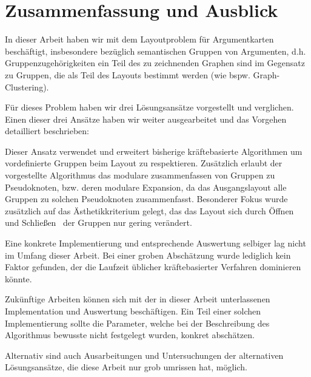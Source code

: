 \chapter{Zusammenfassung und Ausblick}
In dieser Arbeit haben wir mit dem Layoutproblem für Argumentkarten beschäftigt, insbesondere bezüglich semantischen %
Gruppen von Argumenten, 
d.h. Gruppenzugehörigkeiten ein Teil des zu zeichnenden Graphen sind im Gegensatz zu Gruppen, die als Teil des Layouts bestimmt werden (wie bspw. Graph-Clustering).

Für dieses Problem haben wir drei Lösungsansätze vorgestellt und verglichen. 
Einen dieser drei Ansätze %
 haben wir weiter ausgearbeitet und das Vorgehen detailliert beschrieben:

Dieser Ansatz %
verwendet und erweitert bisherige kräftebasierte Algorithmen um vordefinierte Gruppen beim Layout zu respektieren. 
Zusätzlich erlaubt der vorgestellte Algorithmus das modulare %
zusammenfassen von Gruppen zu Pseudoknoten, %
bzw. deren modulare Expansion, da das Ausgangslayout alle Gruppen zu solchen Pseudoknoten zusammenfasst. 
Besonderer Fokus wurde zusätzlich auf das Ästhetikkriterium gelegt, das das Layout sich durch \glqq Öffnen und Schließen\grqq\  %
der Gruppen nur gering verändert.

Eine konkrete Implementierung und entsprechende Auswertung selbiger lag nicht im Umfang dieser Arbeit.
Bei einer groben Abschätzung wurde lediglich kein %
Faktor gefunden, der die Laufzeit üblicher kräftebasierter Verfahren dominieren %
könnte.

Zukünftige Arbeiten können sich mit der in dieser Arbeit unterlassenen Implementation und Auswertung beschäftigen. Ein Teil einer solchen Implementierung sollte die Parameter, welche bei der Beschreibung des Algorithmus bewusste nicht festgelegt wurden, konkret abschätzen.

Alternativ sind auch Ausarbeitungen und Untersuchungen der alternativen Lösungsansätze, die diese Arbeit nur grob umrissen hat, möglich.

